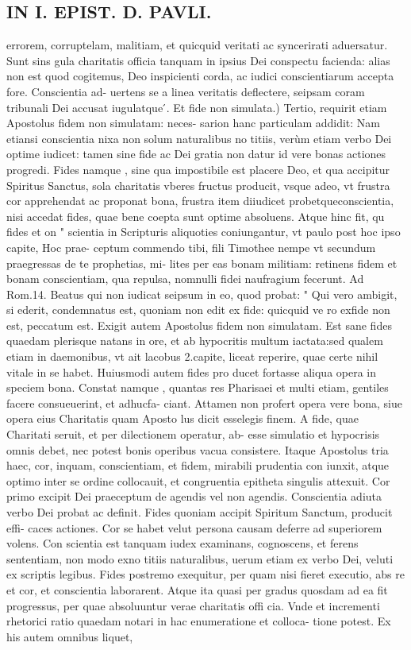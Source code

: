 \documentclass{article}
\begin{document}
\begin{pages}
\section*{IN I. EPIST. D. PAVLI. }
\marginpar{[ p.23 ]}\pstart errorem, corruptelam, malitiam, et quicquid veritati ac syncerirati aduersatur. Sunt sins gula charitatis officia tanquam in ipsius Dei conspectu facienda: alias non est quod cogitemus, Deo inspicienti corda, ac iudici conscientiarum accepta fore. Conscientia ad- uertens se a linea veritatis deflectere, seipsam coram tribunali Dei accusat iugulatque ́.  \pend\pstart Et fide non simulata.) Tertio, requirit etiam Apostolus fidem non simulatam: neces- sarion hanc particulam addidit: Nam etiansi conscientia nixa non solum naturalibus no titiis, verùm etiam verbo Dei optime iudicet: tamen sine fide ac Dei gratia non datur id vere bonas actiones progredi. Fides namque , sine qua impostibile est placere Deo, et qua accipitur Spiritus Sanctus, sola charitatis vberes fructus producit, vsque  adeo, vt frustra cor apprehendat ac proponat bona, frustra item diiudicet probetqueconscientia, nisi accedat fides, quae bene coepta sunt optime absoluens. Atque  hinc fit, qu fides et on " scientia in Scripturis aliquoties coniungantur, vt paulo post hoc ipso capite, Hoc prae-   ceptum commendo tibi, fili Timothee nempe vt secundum praegressas de te prophetias, mi-   lites per eas bonam militiam: retinens fidem et bonam conscientiam, qua repulsa, nomnulli fidei   naufragium fecerunt. Ad Rom.14. Beatus qui non iudicat seipsum in eo, quod probat: " Qui vero ambigit, si ederit, condemnatus est, quoniam non edit ex fide: quicquid ve   ro exfide non est, peccatum est. Exigit autem Apostolus fidem non simulatam. Est sane fides quaedam plerisque  natans in ore, et ab hypocritis multum iactata:sed qualem etiam in daemonibus, vt ait lacobus 2.capite, liceat reperire, quae certe nihil vitale in se habet. Huiusmodi autem fides pro ducet fortasse aliqua opera in speciem bona. Constat namque , quantas res Pharisaei et multi etiam, gentiles facere consueuerint, et adhucfa- ciant. Attamen non profert opera vere bona, siue opera eius Charitatis quam Aposto lus dicit esselegis finem. A fide, quae Charitati seruit, et per dilectionem operatur, ab- esse simulatio et hypocrisis omnis debet, nec potest bonis operibus vacua consistere. Itaque  Apostolus tria haec, cor, inquam, conscientiam, et fidem, mirabili prudentia con iunxit, atque  optimo inter se ordine collocauit, et congruentia epitheta singulis attexuit. Cor primo excipit Dei praeceptum de agendis vel non agendis. Conscientia adiuta verbo Dei probat ac definit. Fides quoniam accipit Spiritum Sanctum, producit effi- caces actiones. Cor se habet velut persona causam deferre ad superiorem volens. Con scientia est tanquam iudex examinans, cognoscens, et ferens sententiam, non modo exno titiis naturalibus, uerum etiam ex verbo Dei, veluti ex scriptis legibus. Fides postremo exequitur, per quam nisi fieret executio, abs re et cor, et conscientia laborarent. Atque  ita quasi per gradus quosdam ad ea fit progressus, per quae absoluuntur verae charitatis offi cia. Vnde et incrementi rhetorici ratio quaedam notari in hac enumeratione et colloca- tione potest. Ex his autem omnibus liquet, 
\end{pages}
\end{document}
